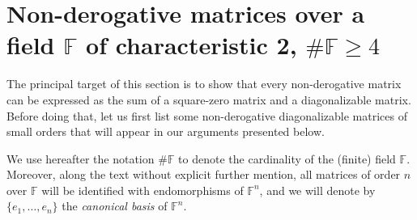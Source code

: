 \documentclass{amsart}
\def\FF{\mathbb{F}}
\theoremstyle{definition}
\theoremstyle{remark}
\numberwithin{equation}{section}
\begin{document}
\section{Non-derogative matrices over a field $\FF$ of characteristic 2, $\#\FF\ge4$}

The principal target of this section is to show that every non-derogative matrix can be expressed as the sum of a square-zero matrix and a diagonalizable matrix. Before doing that, let us first list some non-derogative diagonalizable matrices of small orders that will appear in our arguments presented below.

\medskip

We use hereafter the notation $\#\FF$ to denote the cardinality of the (finite) field $\FF$. Moreover, along the text without explicit further mention, all matrices of order $n$ over $\FF$ will be identified with endomorphisms of $\FF^n$, and we will denote by $\{e_1,\dots, e_n\}$ the {\it canonical basis} of $\FF^n$.

\medskip
\end{document}

